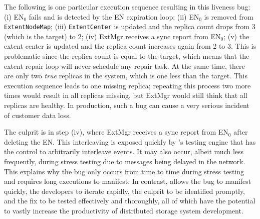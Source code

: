 The following is one particular execution sequence resulting in this liveness bug: (i) EN$_0$ fails and is detected by the EN expiration loop; (ii) EN$_0$ is removed from \texttt{ExtentNodeMap}; (iii) \texttt{ExtentCenter} is updated and the replica count drops from 3 (which is the target) to 2; (iv) ExtMgr receives a sync report from EN$_0$; (v) the extent center is updated and the replica count increases again from 2 to 3. This is problematic since the replica count is equal to the target, which means that the extent repair loop will never schedule any repair task. At the same time, there are only two \emph{true} replicas in the system, which is one less than the target. This execution sequence leads to one missing replica; repeating this process two more times would result in all replicas missing, but ExtMgr would still think that all replicas are healthy. In production, such a bug can cause a very serious incident of customer data loss.

The culprit is in step (iv), where ExtMgr receives a sync report from EN$_0$ after deleting the EN. This interleaving is exposed quickly by \psharp's testing engine that has the control to arbitrarily interleave events. It may also occur, albeit much less frequently, during stress testing due to messages being delayed in the network. This explains why the bug only occurs from time to time during stress testing and requires long executions to manifest. In contrast, \psharp allows the bug to manifest quickly, the developers to iterate rapidly, the culprit to be identified promptly, and the fix to be tested effectively and thoroughly, all of which have the potential to vastly increase the productivity of distributed storage system development.
